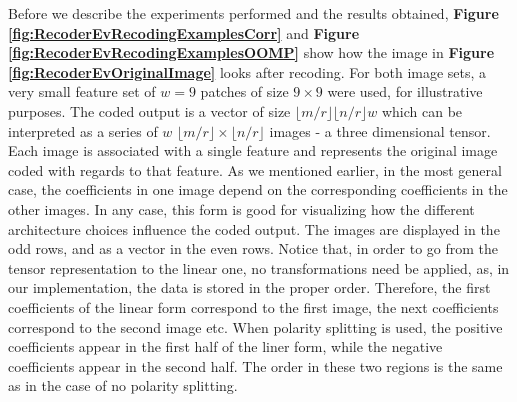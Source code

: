 \documentclass[12pt,a4paper,oneside,english]{UPBThesis}
\newcommand{\hctimes}[2]{{#1}\!\times\!{#2}}
\begin{document}
Before we describe the experiments performed and the results obtained, \textbf{Figure \ref{fig:RecoderEvRecodingExamplesCorr}} and \textbf{Figure \ref{fig:RecoderEvRecodingExamplesOOMP}} show how the image in \textbf{Figure \ref{fig:RecoderEvOriginalImage}} looks after recoding. For both image sets, a very small feature set of $w=9$ patches of size $\hctimes{9}{9}$ were used, for illustrative purposes. The coded output is a vector of size $\lfloor m / r \rfloor \lfloor n / r \rfloor w$ which can be interpreted as a series of $w$ $\hctimes{\lfloor m / r \rfloor}{\lfloor n / r \rfloor}$ images - a three dimensional tensor. Each image is associated with a single feature and represents the original image coded with regards to that feature. As we mentioned earlier, in the most general case, the coefficients in one image depend on the corresponding coefficients in the other images. In any case, this form is good for visualizing how the different architecture choices influence the coded output. The images are displayed in the odd rows, and as a vector in the even rows. Notice that, in order to go from the tensor representation to the linear one, no transformations need be applied, as, in our implementation, the data is stored in the proper order. Therefore, the first coefficients of the linear form correspond to the first image, the next coefficients correspond to the second image etc. When polarity splitting is used, the positive coefficients appear in the first half of the liner form, while the negative coefficients appear in the second half. The order in these two regions is the same as in the case of no polarity splitting.
\end{document}
